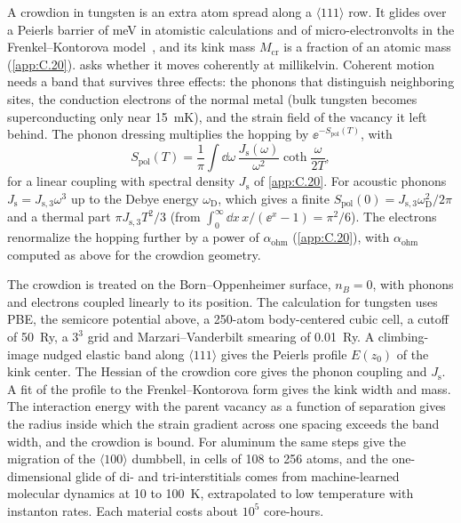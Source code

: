 A crowdion in tungsten is an extra atom spread along a $\langle111\rangle$ row. It glides over a Peierls barrier of meV in atomistic calculations and of micro-electronvolts in the Frenkel--Kontorova model~\cite{fitzgerald2018structure}, and its kink mass $M_{\mathrm{cr}}$ is a fraction of an atomic mass (\cref{app:C.20}).  asks whether it moves coherently at millikelvin. Coherent motion needs a band that survives three effects: the phonons that distinguish neighboring sites, the conduction electrons of the normal metal (bulk tungsten becomes superconducting only near \SI{15}{mK}), and the strain field of the vacancy it left behind. The phonon dressing multiplies the hopping by $\ee^{-S_{\mathrm{pol}}(T)}$, with
\begin{equation}
  S_{\mathrm{pol}}(T) = \frac{1}{\pi}\int\dd\omega\,\frac{J_{\mathrm{s}}(\omega)}{\omega^2}\coth\frac{\omega}{2T} ,
  \label{eq:E.22-Spol}
\end{equation}
for a linear coupling with spectral density $J_{\mathrm{s}}$ of \cref{app:C.20}. For acoustic phonons $J_{\mathrm{s}} = J_{\mathrm{s},3}\omega^3$ up to the Debye energy $\omega_{\mathrm{D}}$, which gives a finite $S_{\mathrm{pol}}(0) = J_{\mathrm{s},3}\omega_{\mathrm{D}}^2/2\pi$ and a thermal part $\pi J_{\mathrm{s},3}T^2/3$ (from $\int_0^\infty\dd x\,x/(\ee^x - 1) = \pi^2/6$). The electrons renormalize the hopping further by a power of $\alpha_{\mathrm{ohm}}$ (\cref{app:C.20}), with $\alpha_{\mathrm{ohm}}$ computed as above for the crowdion geometry.

The crowdion is treated on the Born--Oppenheimer surface, $n_B = 0$, with phonons and electrons coupled linearly to its position. The calculation for tungsten uses PBE, the semicore potential above, a 250-atom body-centered cubic cell, a cutoff of \SI{50}{Ry}, a $3^3$ grid and Marzari--Vanderbilt smearing of \SI{0.01}{Ry}. A climbing-image nudged elastic band along $\langle111\rangle$ gives the Peierls profile $E(z_0)$ of the kink center. The Hessian of the crowdion core gives the phonon coupling and $J_{\mathrm{s}}$. A fit of the profile to the Frenkel--Kontorova form gives the kink width and mass. The interaction energy with the parent vacancy as a function of separation gives the radius inside which the strain gradient across one spacing exceeds the band width, and the crowdion is bound. For aluminum the same steps give the migration of the $\langle100\rangle$ dumbbell, in cells of 108 to 256 atoms, and the one-dimensional glide of di- and tri-interstitials comes from machine-learned molecular dynamics at 10 to \SI{100}{K}, extrapolated to low temperature with instanton rates. Each material costs about $10^5$ core-hours.

